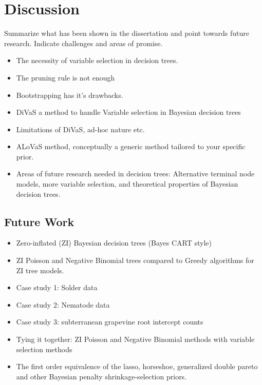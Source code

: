 \section{Discussion}
\label{ch:discuss}

Summarize what has been shown in the dissertation and point towards future research. Indicate challenges and areas of promise. 

\begin{itemize}
\item The necessity of variable selection in decision trees. 
\item The pruning rule is not enough
\item Bootstrapping has it's drawbacks. 
\item DiVaS a method to handle Variable selection in Bayesian decision trees
\item Limitations of DiVaS, ad-hoc nature etc. 
\item ALoVaS method, conceptually a generic method tailored to your specific prior.
\item Areas of future research needed in decision trees: Alternative terminal node models, more variable selection, and theoretical properties of Bayesian decision trees.
\end{itemize}

\subsection{Future Work}

\begin{itemize}
\item Zero-inflated (ZI) Bayesian decision trees (Bayes CART style)
\item ZI Poisson and Negative Binomial trees compared to Greedy algorithms for ZI tree models. 
\item Case study 1: Solder data 
\item Case study 2: Nematode data 
\item Case study 3: subterranean grapevine root intercept counts
\item Tying it together: ZI Poisson and Negative Binomial methods with variable selection methods
\item The first order equivalence of the lasso, horseshoe, generalized double pareto and other Bayesian penalty shrinkage-selection priors. 
\end{itemize}